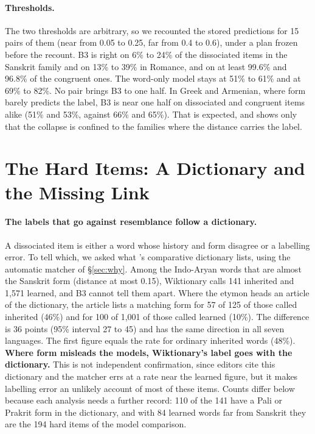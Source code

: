\documentclass[11pt]{article}
\begin{document}
\paragraph{Thresholds.} The two thresholds are arbitrary, so we recounted the stored predictions for 15 pairs of them (near from 0.05 to 0.25, far from 0.4 to 0.6), under a plan frozen before the recount. B3 is right on 6\% to 24\% of the dissociated items in the Sanskrit family and on 13\% to 39\% in Romance, and on at least 99.6\% and 96.8\% of the congruent ones. The word-only model stays at 51\% to 61\% and at 69\% to 82\%. No pair brings B3 to one half. In Greek and Armenian, where form barely predicts the label, B3 is near one half on dissociated and congruent items alike (51\% and 53\%, against 66\% and 65\%). That is expected, and shows only that the collapse is confined to the families where the distance carries the label.

\section{The Hard Items: A Dictionary and the Missing Link}
\label{sec:link}

\paragraph{The labels that go against resemblance follow a dictionary.} A dissociated item is either a word whose history and form disagree or a labelling error. To tell which, we asked what \citeauthor{turner1966cdial}'s comparative dictionary lists, using the automatic matcher of \S\ref{sec:why}. Among the Indo-Aryan words that are almost the Sanskrit form (distance at most 0.15), Wiktionary calls 141 inherited and 1,571 learned, and B3 cannot tell them apart. Where the etymon heads an article of the dictionary, the article lists a matching form for 57 of 125 of those called inherited (46\%) and for 100 of 1,001 of those called learned (10\%). The difference is 36 points (95\% interval 27 to 45) and has the same direction in all seven languages. The first figure equals the rate for ordinary inherited words (48\%). \textbf{Where form misleads the models, Wiktionary's label goes with the dictionary.} This is not independent confirmation, since editors cite this dictionary and the matcher errs at a rate near the learned figure, but it makes labelling error an unlikely account of most of these items. Counts differ below because each analysis needs a further record: 110 of the 141 have a Pali or Prakrit form in the dictionary, and with 84 learned words far from Sanskrit they are the 194 hard items of the model comparison.
\end{document}
